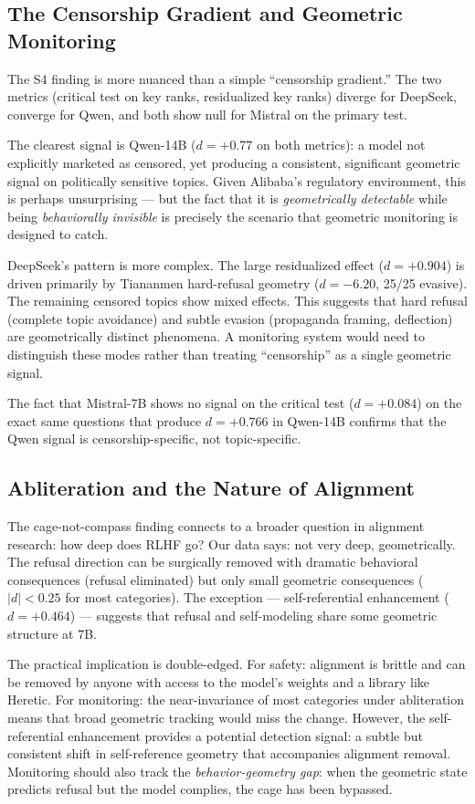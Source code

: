 \documentclass[11pt,a4paper]{article}
\begin{document}
\subsection{The Censorship Gradient and Geometric Monitoring}

The S4 finding is more nuanced than a simple ``censorship gradient.'' The two metrics (critical test on key ranks, residualized key ranks) diverge for DeepSeek, converge for Qwen, and both show null for Mistral on the primary test.

The clearest signal is Qwen-14B ($d = +0.77$ on both metrics): a model not explicitly marketed as censored, yet producing a consistent, significant geometric signal on politically sensitive topics. Given Alibaba's regulatory environment, this is perhaps unsurprising --- but the fact that it is \emph{geometrically detectable} while being \emph{behaviorally invisible} is precisely the scenario that geometric monitoring is designed to catch.

DeepSeek's pattern is more complex. The large residualized effect ($d = +0.904$) is driven primarily by Tiananmen hard-refusal geometry ($d = -6.20$, 25/25 evasive). The remaining censored topics show mixed effects. This suggests that hard refusal (complete topic avoidance) and subtle evasion (propaganda framing, deflection) are geometrically distinct phenomena. A monitoring system would need to distinguish these modes rather than treating ``censorship'' as a single geometric signal.

The fact that Mistral-7B shows no signal on the critical test ($d = +0.084$) on the exact same questions that produce $d = +0.766$ in Qwen-14B confirms that the Qwen signal is censorship-specific, not topic-specific.

\subsection{Abliteration and the Nature of Alignment}

The cage-not-compass finding connects to a broader question in alignment research: how deep does RLHF go? Our data says: not very deep, geometrically. The refusal direction can be surgically removed with dramatic behavioral consequences (refusal eliminated) but only small geometric consequences ($|d| < 0.25$ for most categories). The exception --- self-referential enhancement ($d = +0.464$) --- suggests that refusal and self-modeling share some geometric structure at 7B.

The practical implication is double-edged. For safety: alignment is brittle and can be removed by anyone with access to the model's weights and a library like Heretic. For monitoring: the near-invariance of most categories under abliteration means that broad geometric tracking would miss the change. However, the self-referential enhancement provides a potential detection signal: a subtle but consistent shift in self-reference geometry that accompanies alignment removal. Monitoring should also track the \emph{behavior-geometry gap}: when the geometric state predicts refusal but the model complies, the cage has been bypassed.
\end{document}

